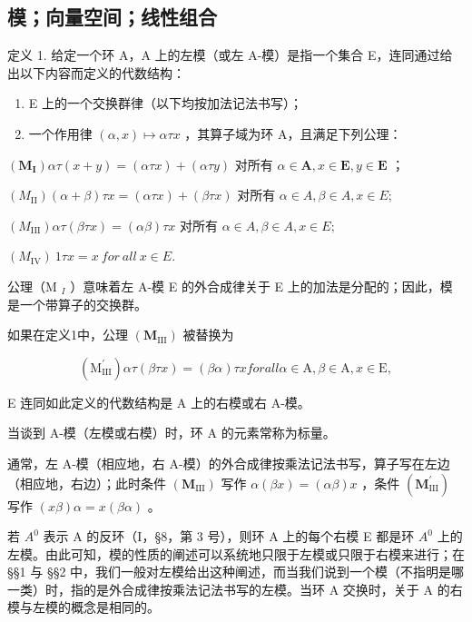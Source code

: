 \subsection{模；向量空间；线性组合}

定义 1. 给定一个环 A，A 上的左模（或左 A-模）是指一个集合 E，连同通过给出以下内容而定义的代数结构：

\begin{enumerate}
\def\labelenumi{(\arabic{enumi})}
\item
  E 上的一个交换群律（以下均按加法记法书写）；
\item
  一个作用律 \((\alpha, x) \mapsto \alpha \tau x\) ，其算子域为环 A，且满足下列公理：
\end{enumerate}

\((\mathbf{M}_{\mathbf{I}})\alpha \tau (x + y) = (\alpha \tau x) + (\alpha \tau y)\) 对所有 \(\alpha \in \mathbf{A}, x \in \mathbf{E}, y \in \mathbf{E}\) ；

\((M_{\mathrm{II}}) (\alpha + \beta) \tau x = (\alpha \tau x) + (\beta \tau x) \text{ 对所有 } \alpha \in A, \beta \in A, x \in E;\)

\((M_{\mathrm{III}})\alpha \tau (\beta \tau x) = (\alpha \beta)\tau x\) 对所有 \(\alpha \in A,\beta \in A,x\in E;\)

\((M_{\mathrm{IV}}) \ 1 \tau x = x \ for \ all \ x \in E.\)

公理（M \(_{I}\) ）意味着左 A-模 E 的外合成律关于 E 上的加法是分配的；因此，模是一个带算子的交换群。

如果在定义1中，公理 \((\mathbf{M}_{\mathrm{III}})\) 被替换为

\[
\left(\mathrm{M} _ {\mathrm{III}} ^ {\prime}\right) \alpha \tau (\beta \tau x) = (\beta \alpha) \tau x for all \alpha \in \mathrm{A}, \beta \in \mathrm{A}, x \in \mathrm{E},
\]

E 连同如此定义的代数结构是 A 上的右模或右 A-模。

当谈到 A-模（左模或右模）时，环 A 的元素常称为标量。

通常，左 A-模（相应地，右 A-模）的外合成律按乘法记法书写，算子写在左边（相应地，右边）；此时条件 \((\mathbf{M}_{\mathrm{III}})\) 写作 \(\alpha(\beta x) = (\alpha\beta)x\) ，条件 \((\mathbf{M}_{\mathrm{III}}^{\prime})\) 写作 \((x\beta)\alpha = x(\beta\alpha)\) 。

若 \(A^{0}\) 表示 A 的反环（I，§8，第 3 号），则环 A 上的每个右模 E 都是环 \(A^{0}\) 上的左模。由此可知，模的性质的阐述可以系统地只限于左模或只限于右模来进行；在 §§1 与 §§2 中，我们一般对左模给出这种阐述，而当我们说到一个模（不指明是哪一类）时，指的是外合成律按乘法记法书写的左模。当环 A 交换时，关于 A 的右模与左模的概念是相同的。

